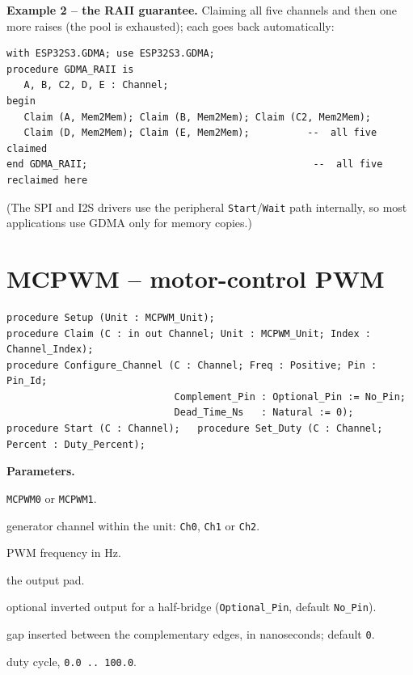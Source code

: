 \textbf{Example 2 -- the RAII guarantee.} Claiming all five channels and then
one more raises (the pool is exhausted); each goes back automatically:
\begin{lstlisting}
with ESP32S3.GDMA; use ESP32S3.GDMA;
procedure GDMA_RAII is
   A, B, C2, D, E : Channel;
begin
   Claim (A, Mem2Mem); Claim (B, Mem2Mem); Claim (C2, Mem2Mem);
   Claim (D, Mem2Mem); Claim (E, Mem2Mem);          --  all five claimed
end GDMA_RAII;                                       --  all five reclaimed here
\end{lstlisting}
(The SPI and I2S drivers use the peripheral \texttt{Start}/\texttt{Wait} path
internally, so most applications use GDMA only for memory copies.)

\section{MCPWM -- motor-control PWM}

\begin{lstlisting}
procedure Setup (Unit : MCPWM_Unit);
procedure Claim (C : in out Channel; Unit : MCPWM_Unit; Index : Channel_Index);
procedure Configure_Channel (C : Channel; Freq : Positive; Pin : Pin_Id;
                             Complement_Pin : Optional_Pin := No_Pin;
                             Dead_Time_Ns   : Natural := 0);
procedure Start (C : Channel);   procedure Set_Duty (C : Channel; Percent : Duty_Percent);
\end{lstlisting}

\textbf{Parameters.}
\begin{description}[style=nextline]
\item[\texttt{Unit}] \texttt{MCPWM0} or \texttt{MCPWM1}.
\item[\texttt{Index}] generator channel within the unit: \texttt{Ch0},
  \texttt{Ch1} or \texttt{Ch2}.
\item[\texttt{Freq}] PWM frequency in Hz.
\item[\texttt{Pin}] the output pad.
\item[\texttt{Complement\_Pin}] optional inverted output for a half-bridge
  (\texttt{Optional\_Pin}, default \texttt{No\_Pin}).
\item[\texttt{Dead\_Time\_Ns}] gap inserted between the complementary edges, in
  nanoseconds; default \texttt{0}.
\item[\texttt{Percent}] duty cycle, \texttt{0.0\,..\,100.0}.
\end{description}

